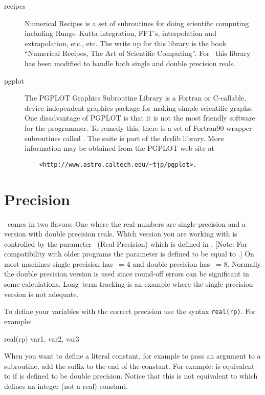 \begin{description}
\item[recipes] Numerical Recipes is a set of subroutines for doing 
scientific computing including Runge--Kutta integration, FFT's,
interpolation and extrapolation, etc., etc. The write up for this
library is the book ``Numerical Recipes, The Art of Scientific
Computing''\cite{b:nr}. For \bmad\ this library has been modified to handle
both single and double precision reals.
\item[pgplot] The PGPLOT Graphics Subroutine Library is a Fortran or 
C-callable, device-independent graphics package for making simple
scientific graphs.  One disadvantage of PGPLOT is that it is not the
most friendly software for the programmer. To remedy this, there is a
set of Fortran90 wrapper subroutines called . The
 suite is part of the dcslib library. More information
may be obtained from the PGPLOT web site at
\begin{verbatim}
    <http://www.astro.caltech.edu/~tjp/pgplot>.
\end{verbatim}

\end{description}

\section{Precision}

\bmad\ comes in two flavors: One where the real numbers are single
precision and a version with double precision reals. Which version you
are working with is controlled by the parameter \ (Real Precision)
which is defined in . [Note: For compatibility with older
programs the parameter  is defined to be equal to .]  On most
machines single precision has \ = 4 and double precision has \ =
8. Normally the double precision version is used since round-off
errors can be significant in some calculations. Long--term tracking is
an example where the single precision version is not adequate. 

To define your variables with the correct precision use the syntax
{\tt real(rp)}. For example:
\begin{example}
    real(rp) var1, var2, var3
\end{example}
When you want to define a literal constant, for example to pass an
argument to a subroutine, add the suffix  to the end of the
constant. For example:  is equivalent to  if
 is defined to be double precision. Notice that this is not
equivalent to  which defines an integer (not a real) constant.


